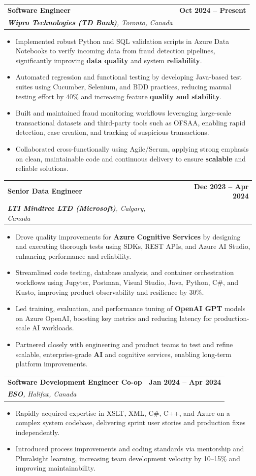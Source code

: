 \documentclass[letterpaper,11pt]{article}
\makeatletter
\newcommand{\resumeItem}[1]{
  \item\small{
    {#1 \vspace{-2pt}}
  }
}
\newcommand{\resumeSubheading}[4]{
  \vspace{-2pt}\item
    \begin{tabular*}{1.0\textwidth}[t]{l@{\extracolsep{\fill}}r}
      \textbf{#1} & \textbf{\small #2} \\
      \textit{\small#3} & \textit{\small #4} \\
    \end{tabular*}\vspace{-7pt}
}
\newcommand{\resumeItemListStart}{\begin{itemize}}
\newcommand{\resumeItemListEnd}{\end{itemize}\vspace{-5pt}}
\makeatother
\begin{document}
    \resumeSubheading
      {\textbf{Software Engineer}}{\textbf{Oct 2024 -- Present}}
      {\textbf{Wipro Technologies (TD Bank)}, Toronto, Canada}{}
      \resumeItemListStart
        \resumeItem{Implemented robust Python and SQL validation scripts in Azure Data Notebooks to verify incoming data from fraud detection pipelines, significantly improving \textbf{data quality} and system \textbf{reliability}.}
        \resumeItem{Automated regression and functional testing by developing Java-based test suites using Cucumber, Selenium, and BDD practices, reducing manual testing effort by 40\% and increasing feature \textbf{quality and stability}.}
        \resumeItem{Built and maintained fraud monitoring workflows leveraging large-scale transactional datasets and third-party tools such as OFSAA, enabling rapid detection, case creation, and tracking of suspicious transactions.}
        \resumeItem{Collaborated cross-functionally using Agile/Scrum, applying strong emphasis on clean, maintainable code and continuous delivery to ensure \textbf{scalable} and reliable solutions.}
      \resumeItemListEnd

    \resumeSubheading
      {\textbf{Senior Data Engineer}}{\textbf{Dec 2023 -- Apr 2024}}
      {\textbf{LTI Mindtree LTD (Microsoft)}, Calgary, Canada}{}
      \resumeItemListStart
        \resumeItem{Drove quality improvements for \textbf{Azure Cognitive Services} by designing and executing thorough tests using SDKs, REST APIs, and Azure AI Studio, enhancing performance and reliability.}
        \resumeItem{Streamlined code testing, database analysis, and container orchestration workflows using Jupyter, Postman, Visual Studio, Java, Python, C\#, and Kusto, improving product observability and resilience by 30\%.}
        \resumeItem{Led training, evaluation, and performance tuning of \textbf{OpenAI GPT} models on Azure OpenAI, boosting key metrics and reducing latency for production-scale AI workloads.}
        \resumeItem{Partnered closely with engineering and product teams to test and refine scalable, enterprise-grade \textbf{AI} and cognitive services, enabling long-term platform improvements.}
      \resumeItemListEnd
    
    \resumeSubheading
      {\textbf{Software Development Engineer Co-op}}{\textbf{Jan 2024 -- Apr 2024}}
      {\textbf{ESO}, Halifax, Canada}{}
      \resumeItemListStart
        \resumeItem{Rapidly acquired expertise in XSLT, XML, C\#, C++, and Azure on a complex system codebase, delivering sprint user stories and production fixes independently.}
        \resumeItem{Introduced process improvements and coding standards via mentorship and Pluralsight learning, increasing team development velocity by 10--15\% and improving maintainability.}
      \resumeItemListEnd
\end{document}
